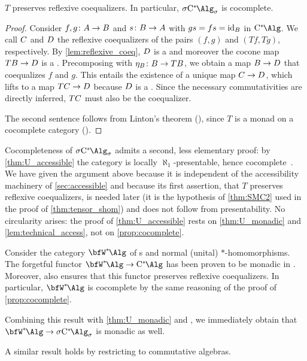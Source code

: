 \begin{proposition}\label{prop:cocomplete}
	$T$ preserves reflexive coequalizers.
	In particular, $\SigmaC$ is cocomplete.
\end{proposition}
\begin{proof}
	Consider $f,g\colon {A}\to{B}$ and $s\colon {B} \to {A}$ with $gs=fs=\operatorname{id}_{{B}}$ in $\Calg$.
	We call ${C}$ and ${D}$ the reflexive coequalizers of the pairs $(f,g)$ and $(Tf,Tg)$, respectively.
	By \cref{lem:reflexive_coeq}, ${D}$ is a \cstars{} and moreover the cocone map $T{B} \to {D}$ is a \starshom{}.
	Precomposing with $\eta_{{B}}\colon {B} \to T{B}$, we obtain a map ${B} \to {D}$ that coequalizes $f$ and $g$.
	This entails the existence of a unique map ${C} \to {D}$, which lifts to a map $T{C} \to {D}$ because ${D}$ is a \cstars{}.
	Since the necessary commutativities are directly inferred, $T{C}$ must also be the coequalizer.

	The second sentence follows from Linton's theorem (\cite[Corollaries 2 and 3]{linton1969coequalizers}), since $T$ is a monad on a cocomplete category (\cite[Section 2]{khoshkam2002categorical}).
\end{proof}
\begin{remark}\label{rem:two_routes_cocomplete}
		Cocompleteness of $\SigmaC$ admits a second, less elementary proof: by \cref{thm:U_accessible} the category is locally $\aleph_1$-presentable, hence cocomplete~\cite[Definition 1.17]{adamek1994locallypresentable}.
		We have given the argument above because it is independent of the accessibility machinery of \cref{sec:accessible} and because its first assertion, that $T$ preserves reflexive coequalizers, is needed later (it is the hypothesis of \cref{thm:SMC2} used in the proof of \cref{thm:tensor_shom}) and does not follow from presentability.
		No circularity arises: the proof of \cref{thm:U_accessible} rests on \cref{thm:U_monadic} and \cref{lem:technical_access}, not on \cref{prop:cocomplete}.
\end{remark}

\begin{remark}\label{rem:monadicity_W}
	Consider the category $\Walg$ of \wstar{}s and normal (unital) $*$-homomorphisms.
	The forgetful functor $\Walg \to \Calg$ has been proven to be monadic in \cite[Theorem 4.6]{furber2024monad}.
	Moreover, \cite[Proposition 4.4]{furber2024monad} also ensures that this functor preserves reflexive coequalizers.
	In particular, $\Walg$ is cocomplete by the same reasoning of the proof of \cref{prop:cocomplete}.

	Combining this result with \cref{thm:U_monadic} and \cite[Corollary 4.5.7]{borceux94handbook2}, we immediately obtain that $\Walg\to \SigmaC$ is monadic as well.

	A similar result holds by restricting to commutative algebras.
\end{remark}

